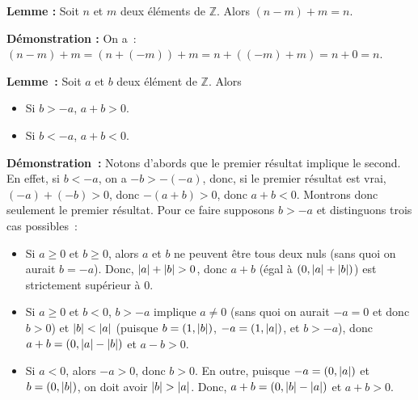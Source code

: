    \done 

\medskip

\noindent\textbf{Lemme :} Soit $n$ et $m$ deux éléments de $\mathbb{Z}$.
    Alors $(n-m) + m = n$. 

\medskip

\noindent\textbf{Démonstration :} On a : $(n-m) + m = (n + (-m)) + m = n + ((-m) + m) = n + 0 = n$.

    \done

\medskip

\noindent\textbf{Lemme :} Soit $a$ et $b$ deux élément de $\mathbb{Z}$. 
    Alors 
    \begin{itemize}[nosep]
        \item Si $b > -a$, $a + b > 0$.
        \item Si $b < -a$, $a + b < 0$.
    \end{itemize}

\medskip

\noindent\textbf{Démonstration :} Notons d'abords que le premier résultat implique le second. 
    En effet, si $b < -a$, on a $-b > -(-a)$, donc, si le premier résultat est vrai, $(-a) + (-b) > 0$, donc $- (a+b) > 0$, donc $a + b < 0$.
    Montrons donc seulement le premier résultat. 
    Pour ce faire supposons $b > -a$ et distinguons trois cas possibles : 
    \begin{itemize}[nosep]
        \item Si $a \geq 0$ et $b \geq 0$, alors $a$ et $b$ ne peuvent être tous deux nuls (sans quoi on aurait $b = -a$).
            Donc, $\left\lvert a \right\rvert + \left\lvert b \right\rvert > 0$, donc $a + b$ (égal à $(0, \left\lvert a \right\rvert + \left\lvert b \right\rvert)$) est strictement supérieur à $0$.
        \item Si $a \geq 0$ et $b < 0$, $b > -a$ implique $a \neq 0$ (sans quoi on aurait $-a = 0$ et donc $b > 0$) et $\left\lvert b \right\rvert < \left\lvert a \right\rvert$ (puisque $b = (1, \left\lvert b \right\rvert)$, $-a = (1, \left\lvert a \right\rvert)$, et $b > -a$), donc $a + b = (0, \left\lvert a \right\rvert - \left\lvert b \right\rvert)$ et $a-b > 0$.
        \item Si $a < 0$, alors $-a > 0$, donc $b > 0$. 
            En outre, puisque $-a = (0, \left\lvert a \right\rvert)$ et $b = (0, \left\lvert b \right\rvert)$, on doit avoir $\left\lvert b \right\rvert > \left\lvert a \right\rvert$. 
            Donc, $a + b = (0, \left\lvert b \right\rvert - \left\lvert a \right\rvert)$ et $a + b > 0$.
    \end{itemize}

    \done

\medskip

